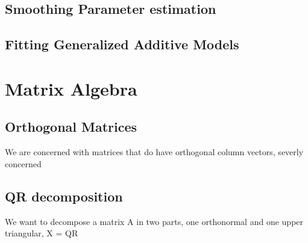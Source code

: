 \documentclass{article}
\begin{document}
    \subsection{Smoothing Parameter estimation}
    \subsection{Fitting Generalized Additive Models}

    \section{Matrix Algebra}
    \subsection{Orthogonal Matrices}
    We are concerned with matrices that do have orthogonal column vectors, severly concerned
    \subsection{QR decomposition}
    We want to decompose a matrix A in two parts, one orthonormal and one upper triangular, X = QR


    \newpage


    \newpage
\end{document}

